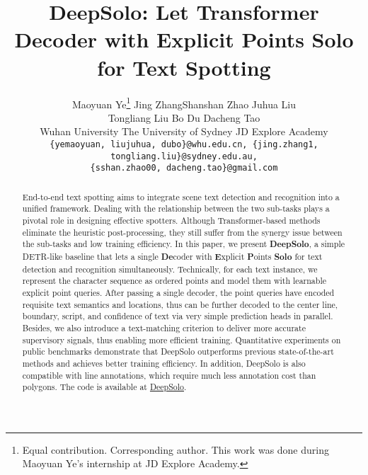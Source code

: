 \documentclass[10pt,twocolumn,letterpaper]{article}
\newcommand{\authorskip}{\hspace{8mm}}
\begin{document}
\title{
DeepSolo: Let Transformer Decoder with Explicit Points Solo for Text Spotting
}

\author{
  Maoyuan Ye\thanks{Equal contribution. \dag Corresponding author. This work was done during Maoyuan Ye's internship at JD Explore Academy.} \authorskip Jing Zhang\footnotemark[1] \authorskip Shanshan Zhao \authorskip Juhua Liu\\
  Tongliang Liu \authorskip Bo Du \authorskip Dacheng Tao\\
  Wuhan University \quad The University of Sydney \quad JD Explore Academy\\
  {\tt\small \{yemaoyuan, liujuhua, dubo\}@whu.edu.cn, \{jing.zhang1, tongliang.liu\}@sydney.edu.au,}\\
  {\tt\small \{sshan.zhao00, dacheng.tao\}@gmail.com}
}

\maketitle

\begin{abstract}
   End-to-end text spotting aims to integrate scene text detection and recognition into a unified framework. Dealing with the relationship between the two sub-tasks plays a pivotal role in designing effective spotters. Although Transformer-based methods eliminate the heuristic post-processing, they still suffer from the synergy issue between the sub-tasks and low training efficiency. In this paper, we present \textbf{DeepSolo}, a simple DETR-like baseline that lets a single \textbf{De}coder with \textbf{E}xplicit \textbf{P}oints \textbf{Solo} for text detection and recognition simultaneously. Technically, for each text instance, we represent the character sequence as ordered points and model them with learnable explicit point queries. After passing a single decoder, the point queries have encoded requisite text semantics and locations, thus can be further decoded to the center line, boundary, script, and confidence of text via very simple prediction heads in parallel. Besides, we also introduce a text-matching criterion to deliver more accurate supervisory signals, thus enabling more efficient training. Quantitative experiments on public benchmarks demonstrate that DeepSolo outperforms previous state-of-the-art methods and achieves better training efficiency. In addition, DeepSolo is also compatible with line annotations, which require much less annotation cost than polygons. The code is available at \href{https://github.com/ViTAE-Transformer/DeepSolo}{DeepSolo}.
\end{abstract}
\end{document}
